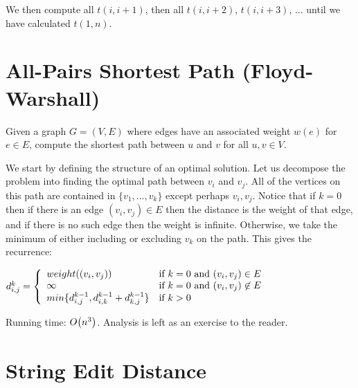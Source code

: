 We then compute all $t(i,i+1)$, then all $t(i,i+2)$, $t(i,i+3)$,
... until we have calculated $t(1,n)$.

\hypertarget{sec:floyd_warshall}{\section{All-Pairs Shortest Path (Floyd-Warshall)}}

Given a graph $G=(V,E)$ where edges have an associated weight $w(e)$
for $e \in E$, compute the shortest path between $u$ and $v$ for all
$u,v \in V$.

We start by defining the structure of an optimal solution.  Let us
decompose the problem into finding the optimal path between $v_i$ and
$v_j$.  All of the vertices on this path are contained in $\{
v_1,...,v_k \}$ except perhaps $v_i,v_j$.  Notice that if $k=0$ then
if there is an edge $(v_i,v_j) \in E$ then the distance is the weight
of that edge, and if there is no such edge then the weight is
infinite.  Otherwise, we take the minimum of either including or
excluding $v_k$ on the path.  This gives the recurrence:

\begin{math}
  d^k_{i,j} = \left\{
    \begin{array}{l l}
      weight((v_i,v_j)) & \text{if $k=0$ and $(v_i,v_j) \in E$} \\
      \infty            & \text{if $k=0$ and $(v_i,v_j) \not \in E$} \\
      min \{ d^{k-1}_{i,j},d^{k-1}_{i,k} + d^{k-1}_{k,j} \} & \text{if $k>0$}
    \end{array} \right.
\end{math}

Running time: $O\!\left(n^3\right)$.  Analysis is left as an exercise to the reader.

\section{String Edit Distance}

